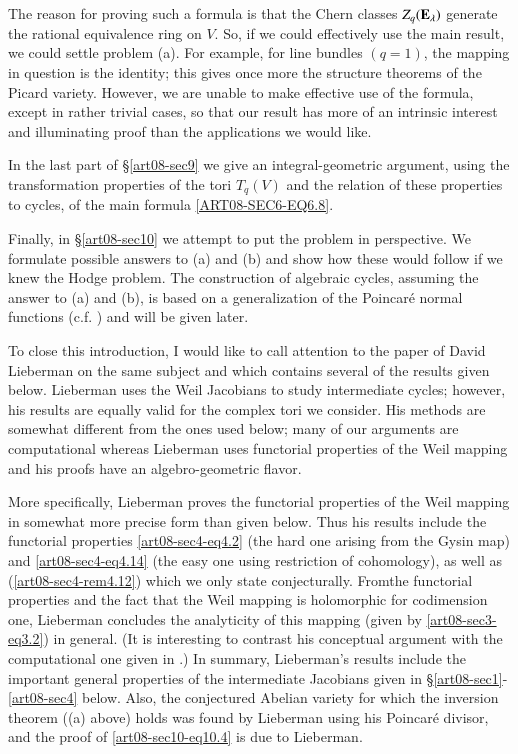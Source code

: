 The reason for proving such a formula is that the Chern classes $Z_{q}(\mathbf{E}_{\lambda})$ generate the rational equivalence ring on $V$. So, if we could effectively use the main result, we could settle problem (a). For example, for line bundles $(q=1)$, the mapping in question is the identity; this gives once more the structure theorems of the Picard variety. However, we are unable to make effective use of the formula, except in rather trivial cases, so that our result has more of an intrinsic interest and illuminating proof than the applications we would like.

In the last part of \S\ref{art08-sec9} we give an integral-geometric argument, using the transformation properties of the tori $T_{q}(V)$ and the relation of these properties to cycles, of the main formula \eqref{ART08-SEC6-EQ6.8}.

Finally, in \S\ref{art08-sec10} we attempt to put the problem in perspective. We formulate possible answers to (a) and (b) and show how these would follow if we knew the Hodge problem. The construction of algebraic cycles, assuming the answer to (a) and (b), is based on a generalization of the Poincar\'e normal functions (c.f. \cite{art08-key19}) and will be given later.

To close this introduction, I would like to call attention to the paper of David Lieberman \cite{art08-key20} on the same subject and which contains several of the results given below. Lieberman uses the Weil Jacobians \cite{art08-key22} to study intermediate cycles; however, his results are equally valid for the complex tori we consider. His methods are somewhat different from the ones used below; many of our arguments are computational whereas Lieberman uses functorial properties of the Weil mapping and his proofs have an algebro-geometric flavor.

More specifically, Lieberman proves the functorial properties of the Weil mapping in somewhat more precise form than given below. Thus his results include the functorial properties \eqref{art08-sec4-eq4.2} (the hard one arising from the Gysin map) and \eqref{art08-sec4-eq4.14} (the easy one using restriction of cohomology), as well as (\ref{art08-sec4-rem4.12}) which we only state conjecturally. From\pageoriginale the functorial properties and the fact that the Weil mapping is holomorphic for codimension one, Lieberman concludes the analyticity of this mapping (given by \eqref{art08-sec3-eq3.2}) in general. (It is interesting to contrast his conceptual argument with the computational one given in \cite{art08-key9}.) In summary, Lieberman's results include the important general properties of the intermediate Jacobians given in \S\ref{art08-sec1}-\ref{art08-sec4} below. Also, the conjectured Abelian variety for which the inversion theorem ((a) above) holds was found by Lieberman using his Poincar\'e divisor, and the proof of \eqref{art08-sec10-eq10.4} is due to Lieberman.

